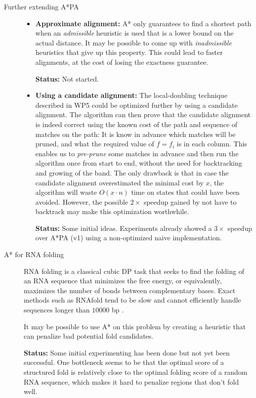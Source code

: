 \documentclass[11pt,english,a4paper]{article}
\begin{document}
\begin{description}
\item[{Further extending A*PA}] \begin{itemize}
\item \textbf{Approximate alignment:} A* only guarantees to find a shortest path when an
\emph{admissible} heuristic is used that is a lower bound on the actual
distance. It may be possible to come up with \emph{inadmissible} heuristics that
give up this property. This could lead to faster alignments, at the cost of
losing the exactness guarantee.

\textbf{Status:} Not started.

\item \textbf{Using a candidate alignment:} The local-doubling technique described
in WP5 could be optimized further by using a candidate alignment.
The algorithm can then prove that the candidate alignment is indeed correct
using the known cost of the path and sequence of matches on the path:
It is know in advance which matches will be pruned, and what the required
value of \(f=f_i\) is in each column. This enables us to \emph{pre-prune} some
matches in advance and then run the algorithm once from start to end,
without the need for backtracking and growing of the band. The only
drawback is that in case the candidate alignment overestimated the minimal
cost by \(x\), the algorithm will waste \(O(x\cdot n)\) time on states that
could have been avoided. However, the possible \(2\times\) speedup gained by
not have to backtrack may make this optimization worthwhile.

\textbf{Status:} Some initial ideas. Experiments already showed a \(3\times\)
speedup over A*PA (v1) using a non-optimized naive implementation.
\end{itemize}

\item[{A* for RNA folding}] RNA folding is a classical cubic DP task that seeks to find the folding of an
RNA sequence that minimizes the free energy, or equivalently, maximizes the
number of bonds between complementary bases. Exact methods such as
RNAfold tend to be slow and cannot efficiently handle sequences longer
than \(10000\) bp \autocite{rnafold}.

It may be possible to use A* on this problem by creating a heuristic that can
penalize bad potential fold candidates.

\textbf{Status:} Some initial experimenting has been done but not yet been
successful. One bottleneck seems to be that the optimal score of a structured
fold is relatively close to the optimal folding score of a random RNA
sequence, which makes it hard to penalize regions that don't fold well.


\end{description}
\end{document}
